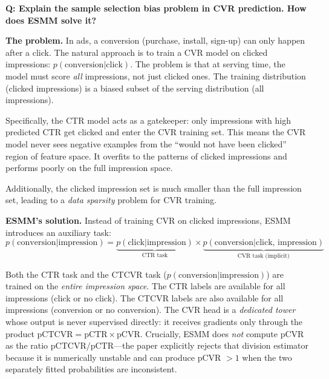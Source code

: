 \begin{interviewq}
\textbf{Q: Explain the sample selection bias problem in CVR prediction. How does ESMM solve it?}

 \quad {} \quad \badgefreq{\freqmed}

\stronganswer

\textbf{The problem.} In ads, a conversion (purchase, install, sign-up) can only happen after a click. The natural approach is to train a CVR model on clicked impressions: $p(\text{conversion} | \text{click})$. The problem is that at serving time, the model must score \textit{all} impressions, not just clicked ones. The training distribution (clicked impressions) is a biased subset of the serving distribution (all impressions).

Specifically, the CTR model acts as a gatekeeper: only impressions with high predicted CTR get clicked and enter the CVR training set. This means the CVR model never sees negative examples from the ``would not have been clicked'' region of feature space. It overfits to the patterns of clicked impressions and performs poorly on the full impression space.

Additionally, the clicked impression set is much smaller than the full impression set, leading to a \textit{data sparsity} problem for CVR training.

\textbf{ESMM's solution.} Instead of training CVR on clicked impressions, ESMM introduces an auxiliary task:
\begin{equation}
p(\text{conversion} | \text{impression}) = \underbrace{p(\text{click} | \text{impression})}_{\text{CTR task}} \times \underbrace{p(\text{conversion} | \text{click, impression})}_{\text{CVR task (implicit)}}
\end{equation}

Both the CTR task and the CTCVR task ($p(\text{conversion} | \text{impression})$) are trained on the \textit{entire impression space}. The CTR labels are available for all impressions (click or no click). The CTCVR labels are also available for all impressions (conversion or no conversion). The CVR head is a \textit{dedicated tower} whose output is never supervised directly: it receives gradients only through the product $\text{pCTCVR} = \text{pCTR} \times \text{pCVR}$. Crucially, ESMM does \textit{not} compute pCVR as the ratio $\text{pCTCVR}/\text{pCTR}$---the paper explicitly rejects that division estimator because it is numerically unstable and can produce pCVR $> 1$ when the two separately fitted probabilities are inconsistent.


\end{interviewq}
